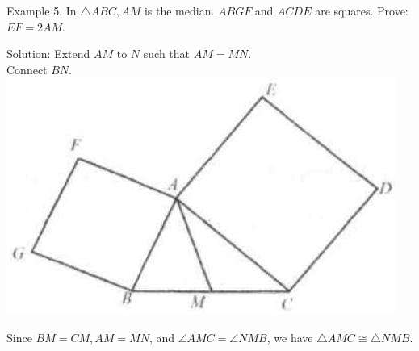 \documentclass[10pt]{article}
\begin{document}
Example 5. In \(\triangle A B C, A M\) is the median. \(A B G F\) and \(A C D E\) are squares. Prove:\\
\(E F=2 A M\).

Solution:
Extend \(A M\) to \(N\) such that \(A M=M N\).\\
Connect \(B N\).\\
\includegraphics[max width=\textwidth, center]{2025_04_17_97bc1f7e44d93c271a88g-025(2)}

Since \(B M=C M, A M=M N\), and \(\angle A M C=\angle N M B\), we have \(\triangle A M C \cong \triangle N M B\).
\end{document}
